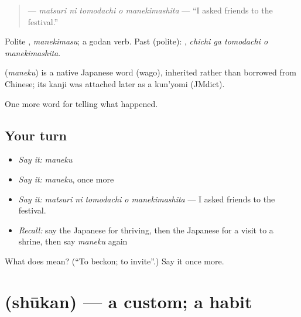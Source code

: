 \begin{quote}
\textbf{  } — \emph{matsuri ni tomodachi o manekimashita} — \textquotedblleft{}I asked friends to the festival.\textquotedblright{}
\end{quote}

Polite \textbf{}, \emph{manekimasu}; a godan verb. Past (polite): \textbf{  }, \emph{chichi ga tomodachi o manekimashita}.

\begin{cousinweb}
\textbf{} (\emph{maneku}) is a native Japanese word (wago), inherited rather than borrowed from Chinese; its kanji was attached later as a kun'yomi (JMdict).
\end{cousinweb}

\begin{grammarlens}[title={What you've built}]
One more word for telling what happened.
\end{grammarlens}

\subsection*{Your turn}
\begin{itemize}
\raggedright
  \item \emph{Say it:} \emph{maneku}
  \item \emph{Say it:} \emph{maneku}, once more
  \item \emph{Say it:} \emph{matsuri ni tomodachi o manekimashita} — I asked friends to the festival.
  \item \emph{Recall:} say the Japanese for thriving, then the Japanese for a visit to a shrine, then say \emph{maneku} again
\end{itemize}

\begin{tcolorbox}[breakable,colback=teal!4,colframe=teal!35!black,title={Before you move on}]
What does  mean? (\textquotedblleft{}To beckon; to invite\textquotedblright{}.) Say it once more.
\end{tcolorbox}
\section[\texorpdfstring{\ja{しゅうかん} (shūkan)}{しゅうかん (shūkan)}]{ (shūkan) — a custom; a habit}

\label{lesson:JA-C296-shuukan}



